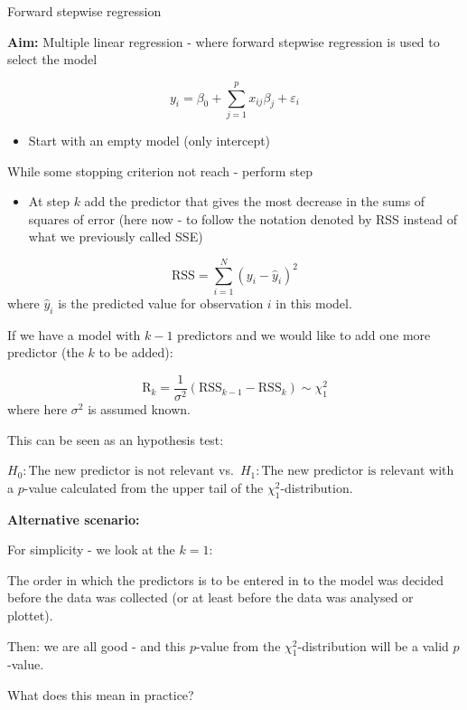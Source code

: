 \documentclass[
  ignorenonframetext,
]{beamer}
\providecommand{\tightlist}{%
  \setlength{\itemsep}{0pt}\setlength{\parskip}{0pt}}
\begin{document}
\begin{frame}

\begin{block}{Forward stepwise regression}

\textbf{Aim:} Multiple linear regression - where forward stepwise
regression is used to select the model

\[y_i=\beta_0+\sum_{j=1}^p x_{ij}\beta_j + \varepsilon_i\]

\begin{itemize}
\tightlist
\item
  Start with an empty model (only intercept)
\end{itemize}

While some stopping criterion not reach - perform step

\begin{itemize}
\tightlist
\item
  At step \(k\) add the predictor that gives the most decrease in the
  sums of squares of error (here now - to follow the notation denoted by
  RSS instead of what we previously called SSE)
\end{itemize}

\[ \text{RSS}=\sum_{i=1}^N (y_i -\hat{y}_i)^2\] where \(\hat{y}_i\) is
the predicted value for observation \(i\) in this model.

\end{block}

\end{frame}

\begin{frame}

If we have a model with \(k-1\) predictors and we would like to add one
more predictor (the \(k\) to be added):

\[ \text{R}_k=\frac{1}{\sigma^2}(\text{RSS}_{k-1}-\text{RSS}_{k})\sim \chi^2_1\]
where here \(\sigma^2\) is assumed known.

This can be seen as an hypothesis test:

\(H_0: \text{The new predictor is not relevant}\)
vs.~\(H_1: \text{The new predictor is relevant}\) with a \(p\)-value
calculated from the upper tail of the \(\chi^2_1\)-distribution.

\end{frame}

\begin{frame}

\textbf{Alternative scenario: }

For simplicity - we look at the \(k=1\):

The order in which the predictors is to be entered in to the model was
decided before the data was collected (or at least before the data was
analysed or plottet).

Then: we are all good - and this \(p\)-value from the
\(\chi^2_1\)-distribution will be a valid \(p\)-value.

What does this mean in practice?

\end{frame}
\end{document}
